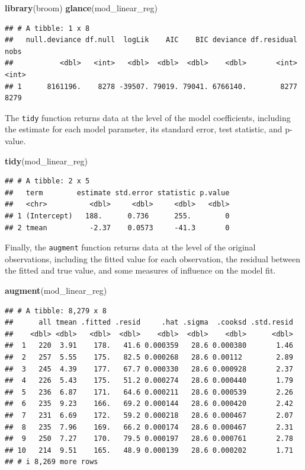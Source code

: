 \documentclass[
]{book}
\newenvironment{Shaded}{\begin{snugshade}}{\end{snugshade}}
\newcommand{\FunctionTok}[1]{\textcolor[rgb]{0.13,0.29,0.53}{\textbf{#1}}}
\newcommand{\NormalTok}[1]{#1}
\begin{document}
\begin{Shaded}
\begin{Highlighting}[]
\FunctionTok{library}\NormalTok{(broom)}
\FunctionTok{glance}\NormalTok{(mod\_linear\_reg)}
\end{Highlighting}
\end{Shaded}

\begin{verbatim}
## # A tibble: 1 x 8
##   null.deviance df.null  logLik    AIC    BIC deviance df.residual  nobs
##           <dbl>   <int>   <dbl>  <dbl>  <dbl>    <dbl>       <int> <int>
## 1      8161196.    8278 -39507. 79019. 79041. 6766140.        8277  8279
\end{verbatim}

The \texttt{tidy} function returns data at the level of the model coefficients,
including the estimate for each model parameter, its standard error, test
statistic, and p-value.

\begin{Shaded}
\begin{Highlighting}[]
\FunctionTok{tidy}\NormalTok{(mod\_linear\_reg)}
\end{Highlighting}
\end{Shaded}

\begin{verbatim}
## # A tibble: 2 x 5
##   term        estimate std.error statistic p.value
##   <chr>          <dbl>     <dbl>     <dbl>   <dbl>
## 1 (Intercept)   188.      0.736      255.        0
## 2 tmean          -2.37    0.0573     -41.3       0
\end{verbatim}

Finally, the \texttt{augment} function returns data at the level of the original
observations, including the fitted value for each observation, the residual
between the fitted and true value, and some measures of influence on the model
fit.

\begin{Shaded}
\begin{Highlighting}[]
\FunctionTok{augment}\NormalTok{(mod\_linear\_reg)}
\end{Highlighting}
\end{Shaded}

\begin{verbatim}
## # A tibble: 8,279 x 8
##      all tmean .fitted .resid     .hat .sigma  .cooksd .std.resid
##    <dbl> <dbl>   <dbl>  <dbl>    <dbl>  <dbl>    <dbl>      <dbl>
##  1   220  3.91    178.   41.6 0.000359   28.6 0.000380       1.46
##  2   257  5.55    175.   82.5 0.000268   28.6 0.00112        2.89
##  3   245  4.39    177.   67.7 0.000330   28.6 0.000928       2.37
##  4   226  5.43    175.   51.2 0.000274   28.6 0.000440       1.79
##  5   236  6.87    171.   64.6 0.000211   28.6 0.000539       2.26
##  6   235  9.23    166.   69.2 0.000144   28.6 0.000420       2.42
##  7   231  6.69    172.   59.2 0.000218   28.6 0.000467       2.07
##  8   235  7.96    169.   66.2 0.000174   28.6 0.000467       2.31
##  9   250  7.27    170.   79.5 0.000197   28.6 0.000761       2.78
## 10   214  9.51    165.   48.9 0.000139   28.6 0.000202       1.71
## # i 8,269 more rows
\end{verbatim}
\end{document}
